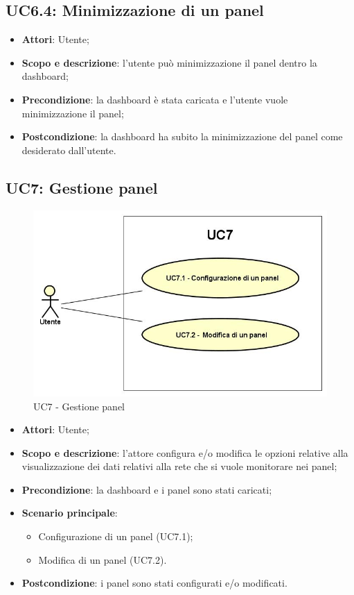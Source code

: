 \subsection{UC6.4: Minimizzazione di un panel}
\hypertarget{UC6.4}{}
\begin{itemize}
	\item \textbf{Attori}: Utente;
	\item \textbf{Scopo e descrizione}: l'utente può minimizzazione il panel dentro la dashboard;
	\item \textbf{Precondizione}: la dashboard è stata caricata e l'utente vuole minimizzazione il panel;
	\item \textbf{Postcondizione}: la dashboard ha subito la minimizzazione del panel come desiderato dall'utente.
\end{itemize}
\subsection{UC7: Gestione panel}
\hypertarget{UC7}{}
\begin{figure} [H]
	\centering
	\includegraphics[scale=0.45]{Img/UC7}
	\caption{UC7 - Gestione panel}\label{}
\end{figure}
\begin{itemize}
	\item \textbf{Attori}: Utente;
	\item \textbf{Scopo e descrizione}: l'attore configura e/o modifica le opzioni relative alla visualizzazione dei dati relativi alla rete che si vuole monitorare nei panel;
	\item \textbf{Precondizione}: la dashboard e i panel sono stati caricati;
	\item \textbf{Scenario principale}:
	\begin{itemize}
		\item Configurazione di un panel (UC7.1);
		\item Modifica di un panel (UC7.2).
	\end{itemize}
	\item \textbf{Postcondizione}: i panel sono stati configurati e/o modificati.
\end{itemize}
